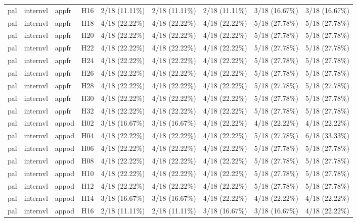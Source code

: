 \begin{longtable}{lllllllll}
pal & internvl & appfr & H16 & 2/18 (11.11\%) & 2/18 (11.11\%) & 2/18 (11.11\%) & 3/18 (16.67\%) & 3/18 (16.67\%) \\
pal & internvl & appfr & H18 & 4/18 (22.22\%) & 4/18 (22.22\%) & 4/18 (22.22\%) & 5/18 (27.78\%) & 5/18 (27.78\%) \\
pal & internvl & appfr & H20 & 4/18 (22.22\%) & 4/18 (22.22\%) & 4/18 (22.22\%) & 5/18 (27.78\%) & 5/18 (27.78\%) \\
pal & internvl & appfr & H22 & 4/18 (22.22\%) & 4/18 (22.22\%) & 4/18 (22.22\%) & 5/18 (27.78\%) & 5/18 (27.78\%) \\
pal & internvl & appfr & H24 & 4/18 (22.22\%) & 4/18 (22.22\%) & 4/18 (22.22\%) & 5/18 (27.78\%) & 5/18 (27.78\%) \\
pal & internvl & appfr & H26 & 4/18 (22.22\%) & 4/18 (22.22\%) & 4/18 (22.22\%) & 5/18 (27.78\%) & 5/18 (27.78\%) \\
pal & internvl & appfr & H28 & 4/18 (22.22\%) & 4/18 (22.22\%) & 4/18 (22.22\%) & 5/18 (27.78\%) & 5/18 (27.78\%) \\
pal & internvl & appfr & H30 & 4/18 (22.22\%) & 4/18 (22.22\%) & 4/18 (22.22\%) & 5/18 (27.78\%) & 5/18 (27.78\%) \\
pal & internvl & appfr & H32 & 4/18 (22.22\%) & 4/18 (22.22\%) & 4/18 (22.22\%) & 5/18 (27.78\%) & 5/18 (27.78\%) \\
pal & internvl & appod & H02 & 3/18 (16.67\%) & 3/18 (16.67\%) & 4/18 (22.22\%) & 4/18 (22.22\%) & 4/18 (22.22\%) \\
pal & internvl & appod & H04 & 4/18 (22.22\%) & 4/18 (22.22\%) & 4/18 (22.22\%) & 5/18 (27.78\%) & 6/18 (33.33\%) \\
pal & internvl & appod & H06 & 4/18 (22.22\%) & 4/18 (22.22\%) & 4/18 (22.22\%) & 5/18 (27.78\%) & 5/18 (27.78\%) \\
pal & internvl & appod & H08 & 4/18 (22.22\%) & 4/18 (22.22\%) & 4/18 (22.22\%) & 5/18 (27.78\%) & 5/18 (27.78\%) \\
pal & internvl & appod & H10 & 4/18 (22.22\%) & 4/18 (22.22\%) & 4/18 (22.22\%) & 5/18 (27.78\%) & 5/18 (27.78\%) \\
pal & internvl & appod & H12 & 4/18 (22.22\%) & 4/18 (22.22\%) & 4/18 (22.22\%) & 5/18 (27.78\%) & 5/18 (27.78\%) \\
pal & internvl & appod & H14 & 3/18 (16.67\%) & 3/18 (16.67\%) & 4/18 (22.22\%) & 4/18 (22.22\%) & 4/18 (22.22\%) \\
pal & internvl & appod & H16 & 2/18 (11.11\%) & 2/18 (11.11\%) & 3/18 (16.67\%) & 3/18 (16.67\%) & 4/18 (22.22\%) \\

\end{longtable}
